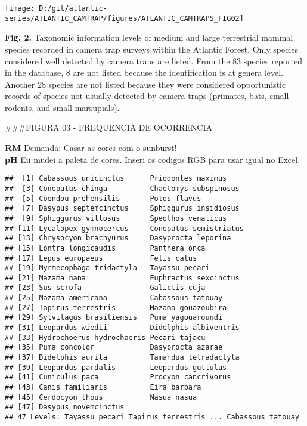 \documentclass[
]{article}
\newenvironment{Shaded}{\begin{snugshade}}{\end{snugshade}}
\newcommand{\FloatTok}[1]{\textcolor[rgb]{0.00,0.00,0.81}{#1}}
\newcommand{\FunctionTok}[1]{\textcolor[rgb]{0.00,0.00,0.00}{#1}}
\newcommand{\NormalTok}[1]{#1}
\newcommand{\SpecialCharTok}[1]{\textcolor[rgb]{0.00,0.00,0.00}{#1}}
\begin{document}
\texttt{[image: D:/git/atlantic-series/ATLANTIC\_CAMTRAP/figures/ATLANTIC\_CAMTRAPS\_FIG02]}

\textbf{Fig. 2.} Taxonomic information levels of medium and large
terrestrial mammal species recorded in camera trap surveys within the
Atlantic Forest. Only species considered well detected by camera traps
are listed. From the 83 species reported in the database, 8 are not
listed because the identification is at genera level. Another 28 species
are not listed because they were considered opportunistic records of
species not usually detected by camera traps (primates, bats, small
rodents, and small marsupials).

\#\#\#FIGURA 03 - FREQUENCIA DE OCORRENCIA

\textbf{RM} Demanda: Casar as cores com o sunburst!\\
\textbf{pH} Eu mudei a paleta de cores. Inseri os codigos RGB para usar
igual no Excel.

\begin{Shaded}
\end{Shaded}

\begin{verbatim}
##  [1] Cabassous unicinctus      Priodontes maximus       
##  [3] Conepatus chinga          Chaetomys subspinosus    
##  [5] Coendou prehensilis       Potos flavus             
##  [7] Dasypus septemcinctus     Sphiggurus insidiosus    
##  [9] Sphiggurus villosus       Speothos venaticus       
## [11] Lycalopex gymnocercus     Conepatus semistriatus   
## [13] Chrysocyon brachyurus     Dasyprocta leporina      
## [15] Lontra longicaudis        Panthera onca            
## [17] Lepus europaeus           Felis catus              
## [19] Myrmecophaga tridactyla   Tayassu pecari           
## [21] Mazama nana               Euphractus sexcinctus    
## [23] Sus scrofa                Galictis cuja            
## [25] Mazama americana          Cabassous tatouay        
## [27] Tapirus terrestris        Mazama gouazoubira       
## [29] Sylvilagus brasiliensis   Puma yagouaroundi        
## [31] Leopardus wiedii          Didelphis albiventris    
## [33] Hydrochoerus hydrochaeris Pecari tajacu            
## [35] Puma concolor             Dasyprocta azarae        
## [37] Didelphis aurita          Tamandua tetradactyla    
## [39] Leopardus pardalis        Leopardus guttulus       
## [41] Cuniculus paca            Procyon cancrivorus      
## [43] Canis familiaris          Eira barbara             
## [45] Cerdocyon thous           Nasua nasua              
## [47] Dasypus novemcinctus     
## 47 Levels: Tayassu pecari Tapirus terrestris ... Cabassous tatouay
\end{verbatim}
\end{document}

